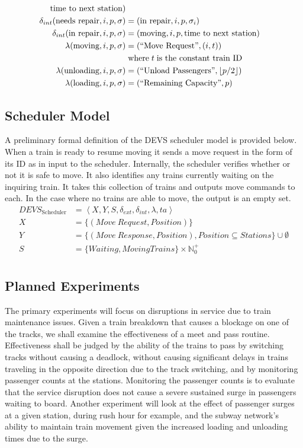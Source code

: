 \begin{align*}
        \text{time to next station}) \\
    \delta_{int}(\text{needs repair}, i, p, \sigma) &= 
        (\text{in repair}, i, p, \sigma_i) \\
    \delta_{int}(\text{in repair}, i, p, \sigma) &= 
        (\text{moving}, i, p, \text{time to next station}) \\  
    \lambda(\text{moving}, i, p, \sigma) &= \OutMoveReq{(i, t)} \\ 
        & \text{\;where\;} t \text{\;is the constant train ID} \\
    \lambda(\text{unloading}, i, p, \sigma) &= \OutUnloadPassengers{\floor*{p/2}} \\
    \lambda(\text{loading}, i, p, \sigma) &= \OutRemainingCapacity{p}
\end{align*}


\subsection{Scheduler Model}
A preliminary formal definition of the DEVS scheduler model is provided below. When a train is ready to resume moving it sends a move request in the form of its ID as in input to the scheduler.  Internally, the scheduler verifies whether or not it is safe to move.  It also identifies any trains currently waiting on the inquiring train.  It takes this collection of trains and outputs move commands to each.  In the case where no trains are able to move, the output is an empty set.
\begin{align*} DEVS_{\textrm{Scheduler}} &= \left<X,Y,S,\delta_{ext},\delta_{int},\lambda,ta\right> \\
X &= \lbrace (Move\ Request,Position)\rbrace \\
Y &= \lbrace(Move\ Response,Position),Position\subseteq Stations\rbrace \cup\emptyset \\
S &= \lbrace Waiting, Moving Trains\rbrace\times \mathbb{N}_0^+ \\
\end{align*}

\subsection{Planned Experiments}
The primary experiments will focus on disruptions in service due to train maintenance issues.  Given a train breakdown that causes a blockage on one of the tracks, we shall examine the effectiveness of a meet and pass routine.  Effectiveness shall be judged by the ability of the trains to pass by switching tracks without causing a deadlock, without causing significant delays in trains traveling in the opposite direction due to the track switching, and by monitoring passenger counts at the stations.  Monitoring the passenger counts is to evaluate that the service disruption does not cause a severe sustained surge in passengers waiting to board.  Another experiment will look at the effect of passenger surges at a given station, during rush hour for example, and the subway network's ability to maintain train movement given the increased loading and unloading times due to the surge.

